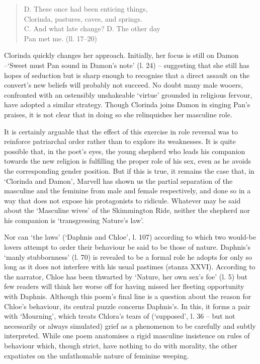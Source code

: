 ﻿\documentclass[12pt]{article}
\begin{document}
\begin{verse}
D. These once had been enticing things,\\
Clorinda, pastures, caves, and springs.\\
C. And what late change? D. The other day\\
Pan met me. (ll. 17–20)
\end{verse}

Clorinda
quickly changes her approach. Initially, her focus is still on Damon –‘Sweet
must Pan sound in Damon’s note’ (l. 24) – suggesting that she still has hopes
of seduction but is sharp enough to recognise that a direct assault on the
convert’s new beliefs will probably not succeed. No doubt many male wooers,
confronted with an ostensibly unshakeable ‘virtue’ grounded in religious
fervour, have adopted a similar strategy. Though Clorinda joins Damon in
singing Pan’s praises, it is not clear that in doing so she relinquishes her
masculine role.

It
is certainly arguable that the effect of this exercise in role reversal was to
reinforce patriarchal order rather than to explore its weaknesses. It is quite
possible that, in the poet’s eyes, the young shepherd who leads his companion
towards the new religion is fulfilling the proper role of his sex, even as he
avoids the corresponding gender position. But if this is true, it remains the
case that, in ‘Clorinda and Damon’, Marvell has shown us the partial separation
of the masculine and the feminine from male and female respectively, and done
so in a way that does not expose his protagonists to ridicule. Whatever may be
said about the ‘Masculine wives’ of the Skimmington Ride, neither the shepherd
nor his companion is ‘transgressing Nature’s law’.

Nor
can ‘the laws’ (‘Daphnis and Chloe’, l. 107) according to which two would-be
lovers attempt to order their behaviour be said to be those of nature.
Daphnis’s ‘manly stubbornness’ (l. 70) is revealed to be a formal role he
adopts for only so long as it does not interfere with his usual pastimes
(stanza XXVI). According to the narrator, Chloe
has been thwarted by ‘Nature, her own sex’s foe’ (l. 5) but few readers will
think her worse off for having missed her fleeting opportunity with Daphnis.
Although this poem’s final line is a question about the reason for Chloe’s
behaviour, its central puzzle concerns Daphnis’s. In this, it forms a pair with
‘Mourning’, which treats Chlora’s tears of (‘supposed’, l. 36 – but not
necessarily or always simulated) grief as a phenomenon to be carefully and
subtly interpreted. While one poem anatomises a rigid masculine insistence on
rules of behaviour which, though strict, have nothing to do with morality, the
other expatiates on the unfathomable nature of feminine weeping.
\end{document}
